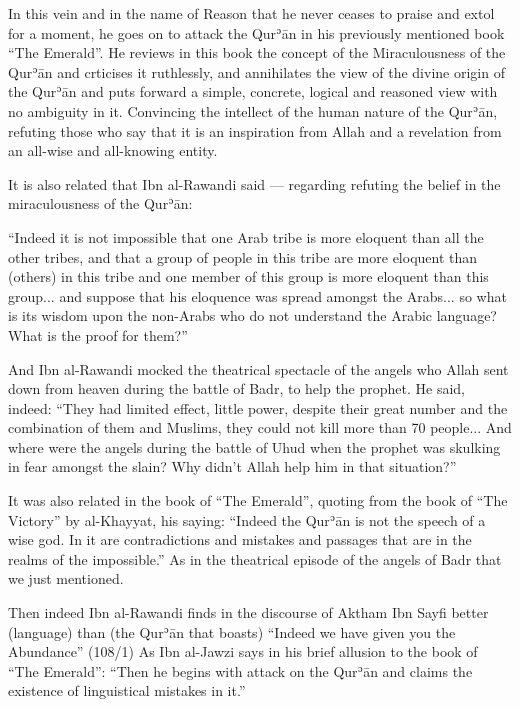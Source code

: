 \documentclass[12pt]{memoir}
\def\´{ʾ} %
\def \Quran{Qur\-\´ān} %
\let \Qrn=\Quran      %
\begin{document}
In this vein and in the name of Reason that he never ceases to praise and extol
for a moment, he goes on to attack the \Qrn{} in his previously mentioned book
“The Emerald”. He reviews in this book the concept of the Miraculousness of the
\Qrn{} and crticises it ruthlessly, and annihilates the view of the divine
origin of the \Qrn{} and puts forward a simple, concrete, logical and reasoned
view with no ambiguity in it. Convincing the intellect of the human nature of
the \Quran, refuting those who say that it is an inspiration from Allah and a
revelation from an all-wise and all-knowing entity.

It is also related that Ibn al-Rawandi said — regarding refuting the belief in
the miraculousness of the \Quran:

“Indeed it is not impossible that one Arab tribe is more eloquent than all the
other tribes, and that a group of people in this tribe are more eloquent than
(others) in this tribe and one member of this group is more eloquent than this
group... and suppose that his eloquence was spread amongst the Arabs... so what
is its wisdom upon the non-Arabs who do not understand the Arabic language?
What is the proof for them?”\footnotemark


And Ibn al-Rawandi mocked the theatrical spectacle of the angels who Allah sent
down from heaven during the battle of Badr, to help the prophet. He said,
indeed: “They had limited effect, little power, despite their great number and
the combination of them and Muslims, they could not kill more than 70 people...
And where were the angels during the battle of Uhud when the prophet was
skulking in fear amongst the slain? Why didn’t Allah help him in that
situation?”\footnotemark


It was also related in the book of “The Emerald”, quoting from the book of
“The Victory” by al-Khayyat, his saying: “Indeed the \Qrn{} is not the speech
of a wise god. In it are contradictions and mistakes and passages that are in
the realms of the impossible.”\footnotemark\@
As in the theatrical episode of the angels of Badr that we just mentioned.


Then indeed Ibn al-Rawandi finds in the discourse of Aktham Ibn Sayfi better
(language) than (the \Qrn{} that boasts) “Indeed we have given you the
Abundance” (108/1)\footnotemark\@
{}
As Ibn al-Jawzi says in his brief allusion to the book of “The Emerald”: “Then
he begins with attack on the \Qrn{} and claims the existence of linguistical
mistakes in it.”\footnotemark
\end{document}
